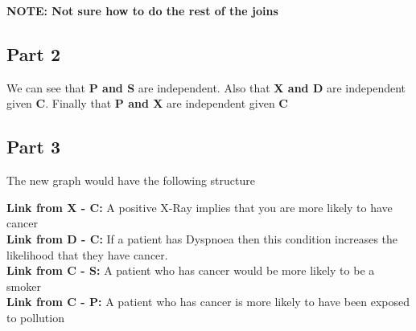 \documentclass[a4paper, 12pt]{article}
\begin{document}
				\textbf{NOTE: Not sure how to do the rest of the joins}		
				
		\subsection{Part 2}
			We can see that \textbf{P and S} are independent. Also that \textbf{X and D} are independent given \textbf{C}. Finally that \textbf{P and X} are independent given \textbf{C}		
		
		\subsection{Part 3}
			The new graph would have the following structure		
		
							\begin{figure}[H]
\centering
{}
\end{figure}

			\textbf{Link from X - C:} A positive X-Ray implies that you are more likely to have cancer\\
			\textbf{Link from D - C:} If a patient has Dyspnoea then this condition increases the likelihood that they have cancer.\\
			\textbf{Link from C - S:} A patient who has cancer would be more likely to be a smoker\\
			\textbf{Link from C - P:} A patient who has cancer is more likely to have been exposed to pollution\\
			
\end{document}
